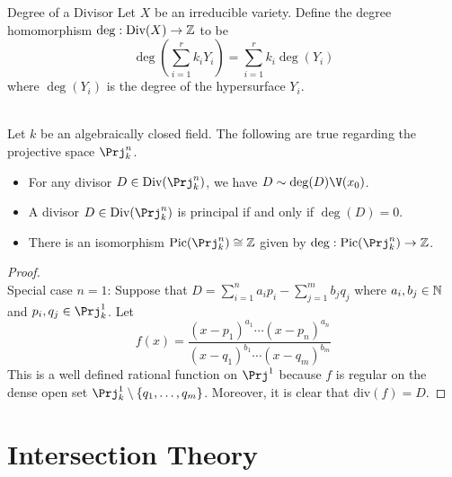 \documentclass[a4paper]{article}
\begin{document}
\begin{defn}{Degree of a Divisor}{} Let $X$ be an irreducible variety. Define the degree homomorphism $\deg:\text{Div}(X)\to\mathbb{Z}$ to be $$\deg\left(\sum_{i=1}^rk_iY_i\right)=\sum_{i=1}^rk_i\deg(Y_i)$$ where $\deg(Y_i)$ is the degree of the hypersurface $Y_i$. 
\end{defn}

\begin{prp}{}{}\\
Let $k$ be an algebraically closed field. The following are true regarding the projective space $\Prj_k^n$. 
\begin{itemize}
\item For any divisor $D\in\text{Div}(\Prj_k^n)$, we have $D\sim\deg(D)\V(x_0)$. 
\item A divisor $D\in\text{Div}(\Prj_k^n)$ is principal if and only if $\deg(D)=0$. 
\item There is an isomorphism $\text{Pic}(\Prj_k^n)\cong\Z$ given by $\deg:\text{Pic}(\Prj_k^n)\to\Z$. 
\end{itemize}
\begin{proof}\\
Special case $n=1$: Suppose that $D=\sum_{i=1}^na_ip_i-\sum_{j=1}^mb_jq_j$ where $a_i,b_j\in\mathbb{N}$ and $p_i,q_j\in\Prj_k^1$. Let $$f(x)=\frac{(x-p_1)^{a_1}\cdots(x-p_n)^{a_n}}{(x-q_1)^{b_1}\cdots(x-q_m)^{b_m}}$$ This is a well defined rational function on $\Prj^1$ because $f$ is regular on the dense open set $\Prj_k^1\setminus\{q_1,\dots,q_m\}$. Moreover, it is clear that $\text{div}(f)=D$. 
\end{proof}
\end{prp}

\pagebreak
\section{Intersection Theory}
\end{document}
